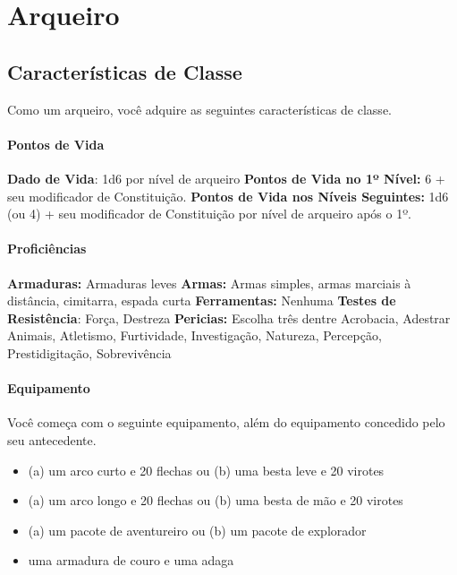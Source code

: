 \documentclass{RPG_Adventure}[2021/10/20]
\begin{document}

\chapter{Arqueiro}%
\label{cha:arqueiro}
\begin{multicols}{2}

\section*{Características de Classe}%

Como um arqueiro, você adquire as seguintes características de classe.

\subsubsection{Pontos de Vida}%

\noindent\textbf{Dado de Vida}: 1d6 por nível de arqueiro \nl
\textbf{Pontos de Vida no 1º Nível:} 6 + seu modificador de Constituição. \nl
\textbf{Pontos de Vida nos Níveis Seguintes:} 1d6 (ou 4) + seu modificador de
Constituição por nível de arqueiro após o 1º.

\subsubsection{Proficiências}%

\noindent\textbf{Armaduras:} Armaduras leves \nl
\textbf{Armas:} Armas simples, armas marciais à distância, cimitarra, espada
curta \nl
\textbf{Ferramentas:} Nenhuma \jump
\textbf{Testes de Resistência}: Força, Destreza \nl
\textbf{Pericias:} Escolha três dentre Acrobacia, Adestrar Animais, Atletismo,
Furtividade, Investigação, Natureza, Percepção, Prestidigitação, Sobrevivência

\subsubsection{Equipamento}%

Você começa com o seguinte equipamento, além do equipamento concedido pelo seu
antecedente.
\begin{itemize}
    \item (a) um arco curto e 20 flechas ou (b) uma besta leve e 20 virotes
    \item (a) um arco longo e 20 flechas ou (b) uma besta de mão e 20 virotes
    \item (a) um pacote de aventureiro ou (b) um pacote de explorador
    \item uma armadura de couro e uma adaga
\end{itemize}


\end{multicols}
\end{document}
